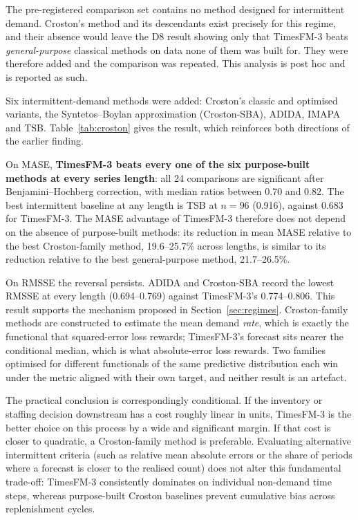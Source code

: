 \documentclass[11pt]{article}
\providecommand{\sectionref}[1]{Section~\ref{#1}}
\providecommand{\tableref}[1]{Table~\ref{#1}}
\begin{document}
The pre-registered comparison set contains no method designed for intermittent demand. Croston's
method \citep{croston1972} and its descendants exist precisely for this regime, and their absence
would leave the D8 result showing only that TimesFM-3 beats \emph{general-purpose} classical
methods on data none of them was built for. They were therefore added and the comparison was repeated.
This analysis is post hoc and is reported as such.

Six intermittent-demand methods were added: Croston's classic and optimised variants, the
Syntetos--Boylan approximation (Croston-SBA), ADIDA, IMAPA and TSB. \tableref{tab:croston} gives
the result, which reinforces both directions of the earlier finding.



On MASE, \textbf{TimesFM-3 beats every one of the six purpose-built methods at every series
length}: all 24 comparisons are significant after Benjamini--Hochberg correction, with median
ratios between 0.70 and 0.82. The best intermittent baseline at any length is TSB at $n = 96$
(0.916), against 0.683 for TimesFM-3. The MASE advantage of TimesFM-3 therefore does
not depend on the absence of purpose-built methods: its reduction in mean MASE relative to the best
Croston-family method, 19.6--25.7\% across lengths, is similar to its reduction relative to the
best general-purpose method, 21.7--26.5\%.

On RMSSE the reversal persists. ADIDA and Croston-SBA record the
lowest RMSSE at every length (0.694--0.769) against TimesFM-3's 0.774--0.806. This result
supports the mechanism proposed in \sectionref{sec:regimes}. Croston-family methods are
constructed to estimate the mean demand \emph{rate}, which is exactly the functional that
squared-error loss rewards; TimesFM-3's forecast sits nearer the conditional median, which is
what absolute-error loss rewards. Two families optimised for different functionals of the same
predictive distribution each win under the metric aligned with their own target, and neither
result is an artefact.

The practical conclusion is correspondingly conditional. If the inventory or staffing decision
downstream has a cost roughly linear in units, TimesFM-3 is the better choice on this process by
a wide and significant margin. If that cost is closer to quadratic, a Croston-family method is
preferable. Evaluating alternative intermittent criteria (such as relative mean absolute errors
or the share of periods where a forecast is closer to the realised count) does not alter this
fundamental trade-off: TimesFM-3 consistently dominates on individual non-demand time steps,
whereas purpose-built Croston baselines prevent cumulative bias across replenishment cycles.
\end{document}
